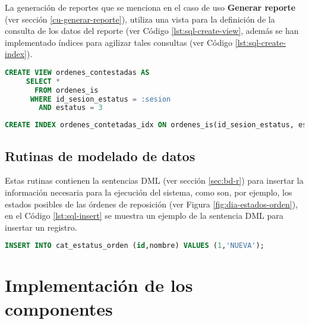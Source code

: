 La generación de reportes que se menciona en el caso de uso \textbf{Generar reporte} (ver sección \ref{cu-generar-reporte}), utiliza una vista para la definición de la consulta de los datos del reporte (ver Código \ref{lst:sql-create-view}, además se han implementado índices para agilizar tales consultas (ver Código \ref{lst:sql-create-index}).

\begin{lstlisting}[language=SQL, caption={Sentencia para crear una vista.}, captionpos=b, label={lst:sql-create-view}]
CREATE VIEW ordenes_contestadas AS
     SELECT *
       FROM ordenes_is
      WHERE id_sesion_estatus = :sesion
        AND estatus = 3
\end{lstlisting}

\begin{lstlisting}[language=SQL, caption={Sentencia para crear un índice.}, captionpos=b, label={lst:sql-create-index}]
CREATE INDEX ordenes_contetadas_idx ON ordenes_is(id_sesion_estatus, estatus);
\end{lstlisting}

\subsection{Rutinas de modelado de datos}
Estas rutinas contienen la sentencias DML (ver sección \ref{sec:bd-r}) para insertar la información necesaria para la ejecución del sistema, como son, por ejemplo, los estados posibles de las órdenes de reposición (ver Figura \ref{fig:dia-estados-orden}), en el Código \ref{lst:sql-insert} se muestra un ejemplo de la sentencia DML para insertar un registro.

\begin{lstlisting}[language=SQL, caption={Sentencia insertar un registro.}, captionpos=b, label={lst:sql-insert}]
INSERT INTO cat_estatus_orden (id,nombre) VALUES (1,'NUEVA');
\end{lstlisting}

%

\section{Implementación de los componentes}








